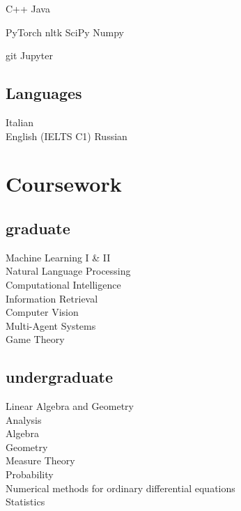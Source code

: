 \documentclass[a4paper]{deedy-resume} %
\begin{document}
\begin{minipage}[t]{0.33\textwidth}
C++ \textbullet{} Java

PyTorch \textbullet nltk \textbullet SciPy \textbullet Numpy

git \textbullet Jupyter

\sectionspace %

\subsection{Languages}

Italian \\

English (IELTS C1) \textbullet{} Russian \\

\sectionspace %


\section{Coursework}

\subsection{graduate}
Machine Learning I & II\\
Natural Language Processing\\
Computational Intelligence\\
Information Retrieval\\
Computer Vision\\
Multi-Agent Systems\\
Game Theory

\sectionspace

\subsection{undergraduate}
Linear Algebra and Geometry\\
Analysis\\
Algebra\\ 
Geometry\\
Measure Theory\\
Probability\\
Numerical methods for ordinary differential equations\\
Statistics


\end{minipage} %
\end{document}
